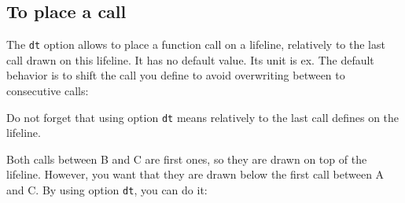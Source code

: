 \documentclass[a4paper,11pt]{report}
\begin{document}
\subsection{To place a call}\label{ss.calldt}

The {\tt dt} option allows to place a function call on a lifeline, relatively to the last call drawn on this lifeline. It has no default value. Its unit is ex. The default behavior is to shift the call you define to avoid overwriting between to consecutive calls:

\medskip

\begin{minipage}{0.5\textwidth}
	
\end{minipage}
\begin{minipage}{0.5\textwidth}
	\begin{center}
	\end{center}
\end{minipage}

\medskip

\begin{remark3}
	Do not forget that using option {\tt dt} means relatively to the last call defines on the lifeline.

	\medskip

	\begin{minipage}{0.4\textwidth}
		
	\end{minipage}
	\begin{minipage}{0.6\textwidth}
		\begin{center}
		\end{center}
	\end{minipage}

	\medskip

	Both calls between B and C are first ones, so they are drawn on top of the lifeline. However, you want that they are drawn below the first call between A and C. By using option {\tt dt}, you can do it:

	\medskip

	\begin{minipage}{0.4\textwidth}
		
	\end{minipage}
	\begin{minipage}{0.6\textwidth}
		\begin{center}
		\end{center}
	\end{minipage}

\end{remark3}
\end{document}
